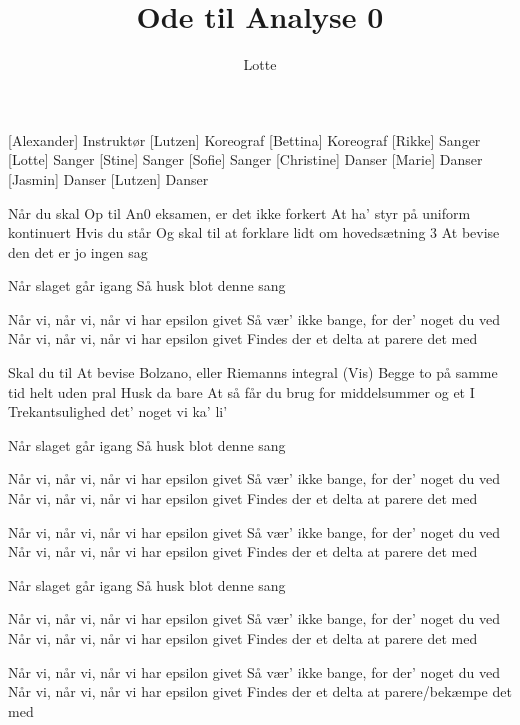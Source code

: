 \documentclass[a4paper,11pt]{article}
\title{Ode til Analyse 0}
\author{Lotte}
\begin{document}
\maketitle

\begin{roles}
[Alexander] Instruktør
[Lutzen] Koreograf
[Bettina] Koreograf
[Rikke] Sanger 
[Lotte] Sanger 
[Stine] Sanger 
[Sofie] Sanger
[Christine] Danser 
[Marie] Danser 
[Jasmin] Danser
[Lutzen] Danser
\end{roles}

\begin{song}



 Når du skal
Op til An0 eksamen, er det ikke forkert
At ha' styr på uniform kontinuert 
Hvis du står
Og skal til at forklare lidt om hovedsætning 3
At bevise den det er jo ingen sag

 Når slaget går igang
Så husk blot denne sang

 Når vi, når vi, når vi har epsilon givet
Så vær' ikke bange, for der' noget du ved
Når vi, når vi, når vi har epsilon givet
Findes der et delta at parere det med

 Skal du til
At bevise Bolzano, eller Riemanns integral
(Vis) Begge to på samme tid helt uden pral
Husk da bare
At så får du brug for middelsummer og et I
Trekantsulighed det' noget vi ka' li'

 Når slaget går igang
Så husk blot denne sang

 Når vi, når vi, når vi har epsilon givet
Så vær' ikke bange, for der' noget du ved
Når vi, når vi, når vi har epsilon givet
Findes der et delta at parere det med

 Når vi, når vi, når vi har epsilon givet
Så vær' ikke bange, for der' noget du ved
Når vi, når vi, når vi har epsilon givet
Findes der et delta at parere det med

 Når slaget går igang
Så husk blot denne sang

 Når vi, når vi, når vi har epsilon givet
Så vær' ikke bange, for der' noget du ved
Når vi, når vi, når vi har epsilon givet
Findes der et delta at parere det med

 Når vi, når vi, når vi har epsilon givet
Så vær' ikke bange, for der' noget du ved
Når vi, når vi, når vi har epsilon givet
Findes der et delta at parere/bekæmpe det med



\end{song}
\end{document}

